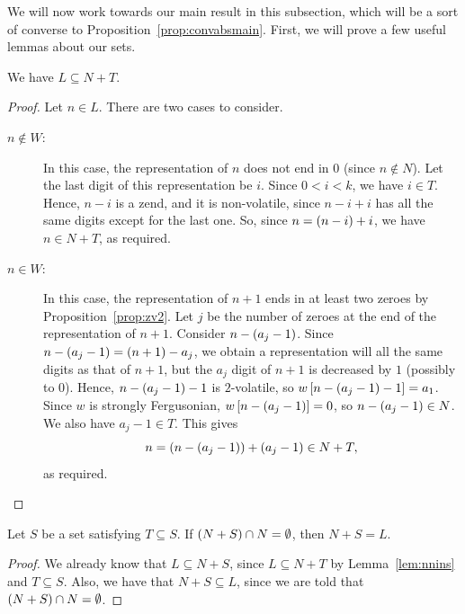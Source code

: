 \documentclass[english,12pt]{article}
\begin{document}
We will now work towards our main result in this subsection, which will be a sort of converse to Proposition~\ref{prop:convabsmain}.
First, we will prove a few useful lemmas about our sets.
\begin{lemma}\label{lem:nnins}
We have $L\subseteq N+T$.
\end{lemma}
\begin{proof}
Let $n\in L$.  There are two cases to consider.
\begin{description}
\item[$n\notin W$:] In this case, the representation of $n$ does not end in $0$ (since $n\notin N$).  Let the last digit of this representation be $i$.  Since $0<i<k$, we have $i\in T$.  Hence, $n-i$ is a zend, and it is non-volatile, since $n-i+i$ has all the same digits except for the last one.  So, since $n=\left(n-i\right)+i$, we have $n\in N+T$, as required.
\item[$n\in W$:] In this case, the representation of $n+1$ ends in at least two zeroes by Proposition~\ref{prop:zv2}.  Let $j$ be the number of zeroes at the end of the representation of $n+1$.  Consider $n-\left(a_j-1\right)$.  Since $n-\left(a_j-1\right)=\left(n+1\right)-a_j$, we obtain a representation will all the same digits as that of $n+1$, but the $a_j$ digit of $n+1$ is decreased by $1$ (possibly to $0$).  Hence, $n-\left(a_j-1\right)-1$ is $2$-volatile, so $w\left[n-\left(a_j-1\right)-1\right]=a_1$.  Since $w$ is strongly Fergusonian, $w\left[n-\left(a_j-1\right)\right]=0$, so $n-\left(a_j-1\right)\in N$.  We also have $a_j-1\in T$.  This gives
\[
n=\left(n-\left(a_j-1\right)\right)+\left(a_j-1\right)\in N+T,
\]
as required.
\end{description}
\end{proof}
\begin{lemma}\label{lem:nsnn}
Let $S$ be a set satisfying $T\subseteq S$.  If $\left(N+S\right)\cap N=\emptyset$, then $N+S=L$.
\end{lemma}
\begin{proof}
We already know that $L\subseteq N+S$, since $L\subseteq N+T$ by Lemma~\ref{lem:nnins} and $T\subseteq S$.  Also, we have that $N+S\subseteq L$, since we are told that $\left(N+S\right)\cap N=\emptyset$.
\end{proof}
\end{document}
